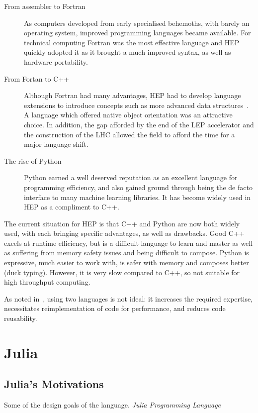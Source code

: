 \documentclass{webofc}
\begin{document}
\begin{description}
    \item[From assembler to Fortran] As computers developed from early
    specialised behemoths, with barely an operating system, improved programming
    languages became available. For technical computing Fortran was the most
    effective language and HEP quickly adopted it as it brought a much improved
    syntax, as well as hardware portability.
    \item[From Fortan to C++] Although Fortran had many advantages, HEP had to
    develop language extensions to introduce concepts such as more advanced data
    structures~\cite{Zoll:2296399}. A language which offered native object
    orientation was an attractive choice. In addition, the gap afforded by the
    end of the LEP accelerator and the construction of the LHC allowed the field
    to afford the time for a major language shift.
    \item[The rise of Python] Python earned a well deserved reputation as an
    excellent language for programming efficiency, and also gained ground
    through being the de facto interface to many machine learning libraries. It
    has become widely used in HEP as a compliment to C++.
\end{description}

The current situation for HEP is that C++ and Python are now both widely used,
with each bringing specific advantages, as well as drawbacks. Good C++ excels at
runtime efficiency, but is a difficult language to learn and master as well as
suffering from memory safety issues and being difficult to compose. Python is
expressive, much easier to work with, is safer with memory and composes better
(duck typing). However, it is very slow compared to C++, so not suitable for
high throughput computing.

As noted in~\cite{eschle2023potential}, using two languages is not ideal: it
increases the required expertise, necessitates reimplementation of code for
performance, and reduces code reusability.

\section{Julia}

\subsection{Julia's Motivations}

Some of the design goals of the language. \emph{Julia Programming
Language}~\cite{bib:julia_freshapproach,10.1145/3276490}
\end{document}

